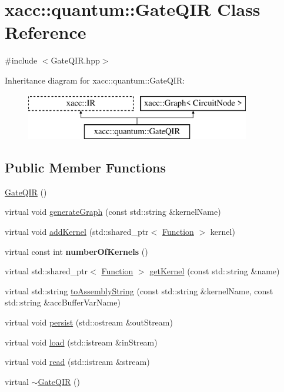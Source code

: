 \hypertarget{a01296}{}\section{xacc\+:\+:quantum\+:\+:Gate\+Q\+IR Class Reference}
\label{a01296}


{\ttfamily \#include $<$Gate\+Q\+I\+R.\+hpp$>$}

Inheritance diagram for xacc\+:\+:quantum\+:\+:Gate\+Q\+IR\+:\begin{figure}[H]
\begin{center}
\leavevmode
\includegraphics[height=2.000000cm]{a01296}
\end{center}
\end{figure}
\subsection*{Public Member Functions}
\begin{DoxyCompactItemize}
\item 
\hyperlink{a01296_afb99f610a6b123538c659169c131a634}{Gate\+Q\+IR} ()
\item 
virtual void \hyperlink{a01296_ad1ddd6105346dd9fc78648fd812285ed}{generate\+Graph} (const std\+::string \&kernel\+Name)
\item 
virtual void \hyperlink{a01296_aa6ed2cf2cbcfec8105c327a4fa95346f}{add\+Kernel} (std\+::shared\+\_\+ptr$<$ \hyperlink{a02456}{Function} $>$ kernel)
\item 
\mbox{\label{a01296_aca6be85526b14f500e7f98954dd6da5c}} 
virtual const int {\bfseries number\+Of\+Kernels} ()
\item 
virtual std\+::shared\+\_\+ptr$<$ \hyperlink{a02456}{Function} $>$ \hyperlink{a01296_a194758b6edcc3ae0c7fe8004f9bfe690}{get\+Kernel} (const std\+::string \&name)
\item 
virtual std\+::string \hyperlink{a01296_a7153f7e9f516d43af3d5d4f95d60bd86}{to\+Assembly\+String} (const std\+::string \&kernel\+Name, const std\+::string \&acc\+Buffer\+Var\+Name)
\item 
virtual void \hyperlink{a01296_a40e1d07e4dfd3794ef53fca3cdbdca61}{persist} (std\+::ostream \&out\+Stream)
\item 
virtual void \hyperlink{a01296_a07f26eeb362ac480d20da6cdc8c8fb39}{load} (std\+::istream \&in\+Stream)
\item 
virtual void \hyperlink{a01296_a26019e2f1e13e64645e29aee86ac58b1}{read} (std\+::istream \&stream)
\item 
virtual \hyperlink{a01296_ac88db03f1dd29e2d36aaa6c01a130008}{$\sim$\+Gate\+Q\+IR} ()
\end{DoxyCompactItemize}
